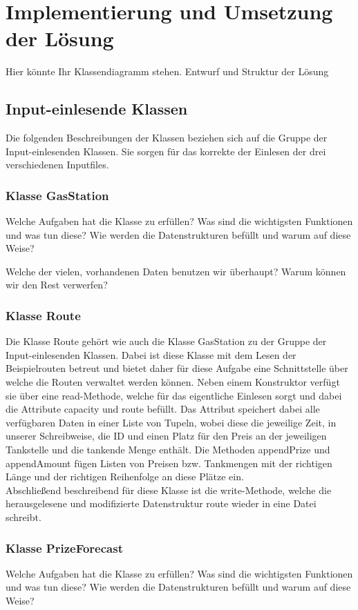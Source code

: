 \documentclass[11pt]{article}
\begin{document}
\section{Implementierung und Umsetzung der Lösung}
	Hier könnte Ihr Klassendiagramm stehen.	
	Entwurf und Struktur der Lösung
\subsection{Input-einlesende Klassen}
	Die folgenden Beschreibungen der Klassen beziehen sich auf die Gruppe der Input-einlesenden Klassen. Sie sorgen für das korrekte der Einlesen der drei verschiedenen Inputfiles.
\subsubsection{Klasse GasStation}
	Welche Aufgaben hat die Klasse zu erfüllen? Was sind die wichtigsten Funktionen und was tun diese? Wie werden die Datenstrukturen befüllt und warum auf diese Weise?

	Welche der vielen, vorhandenen Daten benutzen wir überhaupt? Warum können wir den Rest verwerfen?
\subsubsection{Klasse Route}
	Die Klasse Route gehört wie auch die Klasse GasStation zu der Gruppe der Input-einlesenden Klassen. Dabei ist diese Klasse mit dem Lesen der Beispielrouten betreut und bietet daher für diese Aufgabe eine Schnittstelle über welche die Routen verwaltet werden können. Neben einem Konstruktor verfügt sie über eine read-Methode, welche für das eigentliche Einlesen sorgt und dabei die Attribute capacity und route befüllt. Das Attribut speichert dabei alle verfügbaren Daten in einer Liste von Tupeln, wobei diese die jeweilige Zeit, in unserer Schreibweise, die ID und einen Platz für den Preis an der jeweiligen Tankstelle und die tankende Menge enthält. Die Methoden appendPrize und appendAmount fügen Listen von Preisen bzw. Tankmengen mit der richtigen Länge und der richtigen Reihenfolge an diese Plätze ein. \\
	Abschließend beschreibend für diese Klasse ist die write-Methode, welche die herausgelesene und modifizierte Datenstruktur route wieder in eine Datei schreibt.
\subsubsection{Klasse PrizeForecast}
	Welche Aufgaben hat die Klasse zu erfüllen? Was sind die wichtigsten Funktionen und was tun diese? Wie werden die Datenstrukturen befüllt und warum auf diese Weise?
\end{document}

